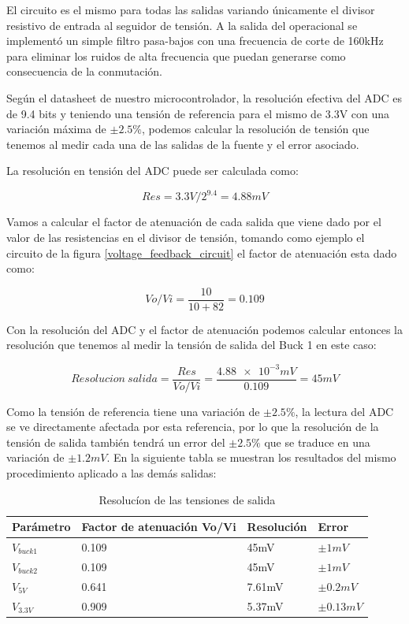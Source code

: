\documentclass[12pt]{report}
\begin{document}
El circuito es el mismo para todas las salidas variando únicamente el divisor resistivo de entrada al seguidor de tensión. A la salida del operacional se implementó un simple filtro pasa-bajos con una frecuencia de corte de 160kHz para eliminar los ruidos de alta frecuencia que puedan generarse como consecuencia de la conmutación. 

Según el datasheet de nuestro microcontrolador, la resolución efectiva del ADC es de 9.4 bits y teniendo una tensión de referencia para el mismo de 3.3V con una variación máxima de $\pm2.5\%$, podemos calcular la resolución de tensión que tenemos al medir cada una de las salidas de la fuente y el error asociado.

La resolución en tensión del ADC puede ser calculada como:

\begin{equation}
	Res = 3.3V / 2^{9.4} = 4.88 mV
\end{equation}

Vamos a calcular el factor de atenuación de cada salida que viene dado por el valor de las resistencias en el divisor de tensión, tomando como ejemplo el circuito de la figura \ref{voltage_feedback_circuit} el factor de atenuación esta dado como:

\begin{equation}
	Vo/Vi = \frac{10}{10 + 82} = 0.109
\end{equation}

Con la resolución del ADC y el factor de atenuación podemos calcular entonces la resolución que tenemos al medir la tensión de salida del Buck 1 en este caso:

\begin{equation}
	Resolucion \ salida = \frac{Res}{Vo/Vi} = \frac{\num{4.88e-3} mV}{0.109} = 45 mV
\end{equation}

Como la tensión de referencia tiene una variación de $\pm2.5\%$, la lectura del ADC se ve directamente afectada por esta referencia, por lo que la resolución de la tensión de salida también tendrá un error del $\pm2.5\%$ que se traduce en una variación de $\pm1.2mV$. En la siguiente tabla se muestran los resultados del mismo procedimiento aplicado a las demás salidas:

\begin{table}[H]
	\centering
	\begin{tabular}{M{2cm}M{5cm}M{3cm}M{3cm}} \toprule
		Parámetro & Factor de atenuación Vo/Vi & Resolución & Error 
		\\ \midrule
		$V_{buck1}$ & 0.109 & 45mV & $\pm1mV$ \\
		$V_{buck2}$ & 0.109 & 45mV & $\pm1mV$ \\
		$V_{5V}$ & 0.641 & 7.61mV & $\pm0.2mV$ \\
		$V_{3.3V}$ & 0.909 & 5.37mV & $\pm0.13mV$ \\
		\bottomrule
	\end{tabular}
	\caption{Resolucíon de las tensiones de salida}
\end{table}
\end{document}
